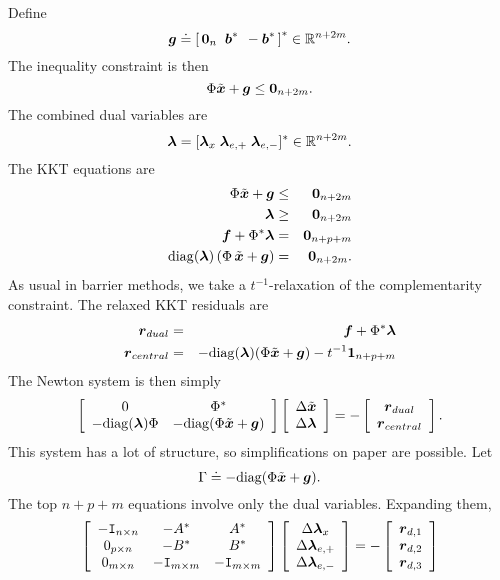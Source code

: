 Define 
\begin{equation}
\boldsymbol{g} \doteq \left[ \, \boldsymbol{0}_n \;\; \boldsymbol{b}^* \;\, -\boldsymbol{b}^* \, \right]^* \in \mathbb R^{n + 2m}.
\end{equation}
The inequality constraint is then $$\Phi \tilde {{\boldsymbol{x}}} + \boldsymbol{g} \le \boldsymbol{0}_{n+2m}.$$
The combined dual variables are 
\begin{equation}
\boldsymbol{\lambda} = [ \boldsymbol{\lambda}_{x} \; \boldsymbol{\lambda}_{e,+} \; \boldsymbol{\lambda}_{e,-} ]^* \in \mathbb R^{n+2m}.
\end{equation}
The KKT equations are 
\begin{eqnarray}
\Phi \tilde {{\boldsymbol{x}}} + \boldsymbol{g} &\le& \boldsymbol{0}_{n+2m} \\
\boldsymbol{\lambda} &\ge& \boldsymbol{0}_{n+2m} \\
\boldsymbol{f} + \Phi^* \boldsymbol{\lambda} &=& \boldsymbol{0}_{n+p+m} \\
\mathrm{diag}(\boldsymbol{\lambda}) \,( \Phi \, \tilde {{\boldsymbol{x}}} + \boldsymbol{g}) &=& \boldsymbol{0}_{n + 2m}.
\end{eqnarray}
As usual in barrier methods, we take a $t^{-1}$-relaxation of the complementarity constraint. The relaxed KKT residuals are 
\begin{eqnarray}
\boldsymbol{r}_{dual}  &=&  \boldsymbol{f} + \Phi^* \boldsymbol{\lambda} \\
\boldsymbol{r}_{central} &=& -\mathrm{diag}(\boldsymbol{\lambda}) (\Phi \tilde {{\boldsymbol{x}}} + \boldsymbol{g}) - t^{-1} {\boldsymbol{1}}_{n+p+m}
\end{eqnarray}
The Newton system is then simply
\begin{equation}
\left[ \begin{array}{cc} 0 & \Phi^* \\ - \mathrm{diag}(\boldsymbol{\lambda}) \Phi & -\mathrm{diag}(\Phi \tilde {{\boldsymbol{x}}} + \boldsymbol{g}) \end{array} \right] \left[ \begin{array}{c} \Delta \tilde {{\boldsymbol{x}}} \\ \Delta \boldsymbol{\lambda} \end{array} \right] = - \left[ \begin{array}{c} \boldsymbol{r}_{dual} \\ \boldsymbol{r}_{central} \end{array} \right].
\end{equation}
This system has a lot of structure, so simplifications on paper are possible. Let
$$\Gamma \doteq - \mathrm{diag}(\Phi \tilde {{\boldsymbol{x}}} + \boldsymbol{g}).$$
The top $n+p+m$ equations involve only the dual variables. Expanding them,
\begin{equation} \label{eqn:d-lambda-only}
\left[ \begin{array}{ccc} -\mathtt{I}_{n\times n} &  -A^* & A^* \\  0_{p \times n} & -B^* & B^* \\ 
0_{m \times n} & -\mathtt{I}_{m \times m} & -\mathtt{I}_{m \times m} \end{array} \right] \left[ \begin{array}{c} \Delta \boldsymbol{\lambda}_{x} \\ \Delta \boldsymbol{\lambda}_{e,+} \\ \Delta \boldsymbol{\lambda}_{e,-} \end{array} \right] = - \left[ \begin{array}{c} \boldsymbol{r}_{d,1} \\ \boldsymbol{r}_{d,2} \\ \boldsymbol{r}_{d,3} \end{array} \right]
\end{equation}
